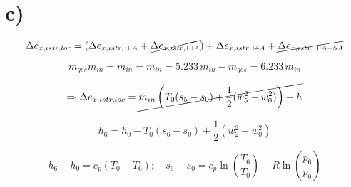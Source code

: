 

\section*{c)}

\[ \Delta e_{x,istr,loc} = (\Delta e_{x,istr,10A} + \cancel{\Delta e_{x,istr,10A}}) + \Delta e_{x,istr,14A} + \cancel{\Delta e_{x,istr,10A-5A}} \]

\[ \dot{m}_{ges} \dot{m}_{in} = \dot{m}_{in} = \dot{m}_{in} = 5.233 \, \dot{m}_{in} - \dot{m}_{ges} = 6.233 \, \dot{m}_{in} \]

\[ \Rightarrow \Delta e_{x,istr,loc} = \cancel{\dot{m}_{in} \left( T_{0} (s_{5} - s_{0}) + \frac{1}{2} (w_{5}^{2} - w_{0}^{2}) \right) + h} \]

\[ h_{6} = h_{0} - T_{0} (s_{6} - s_{0}) + \frac{1}{2} (w_{2}^{2} - w_{0}^{2}) \]

\[ h_{6} - h_{0} = c_{p} (T_{0} - T_{6}); \quad s_{6} - s_{0} = c_{p} \ln \left( \frac{T_{6}}{T_{0}} \right) - R \ln \left( \frac{p_{6}}{p_{0}} \right) \]